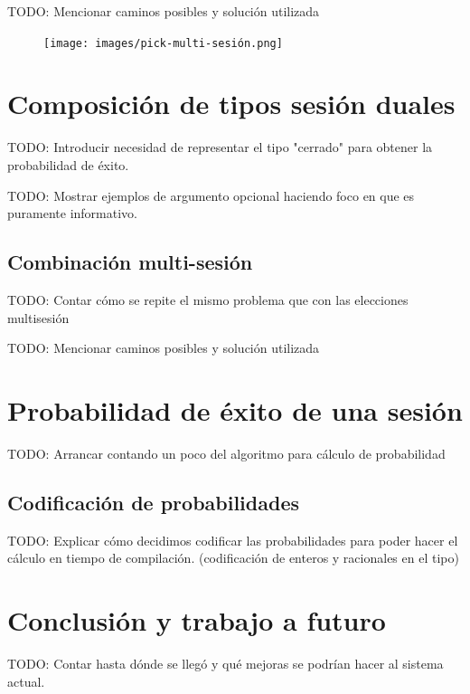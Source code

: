 \begin{frame}{\insertsubsection}
	TODO: Mencionar caminos posibles y solución utilizada
	\begin{figure}
		\centering
		\texttt{[image: images/pick-multi-sesión.png]}
	\end{figure}
\end{frame}

\section{Composición de tipos sesión duales}

\begin{frame}{\insertsection}
	TODO: Introducir necesidad de representar el tipo "cerrado" para obtener la probabilidad de éxito. 
\end{frame}

\begin{frame}{\insertsection}
	TODO: Mostrar ejemplos de argumento opcional haciendo foco en que es puramente informativo.
\end{frame}

\subsection{Combinación multi-sesión}

\begin{frame}{\insertsubsection}
	TODO: Contar cómo se repite el mismo problema que con las elecciones multisesión
\end{frame}

\begin{frame}{\insertsubsection}
	TODO: Mencionar caminos posibles y solución utilizada
\end{frame}

\section{Probabilidad de éxito de una sesión}
\begin{frame}{\insertsection}
	TODO: Arrancar contando un poco del algoritmo para cálculo de probabilidad
\end{frame}

\subsection{Codificación de probabilidades}
\begin{frame}{\insertsubsection}
	TODO: Explicar cómo decidimos codificar las probabilidades para poder hacer el cálculo en tiempo de compilación. (codificación de enteros y racionales en el tipo)
\end{frame}

\section{Conclusión y trabajo a futuro}
\begin{frame}{\insertsection}
	TODO: Contar hasta dónde se llegó y qué mejoras se podrían hacer al sistema actual.
\end{frame}
